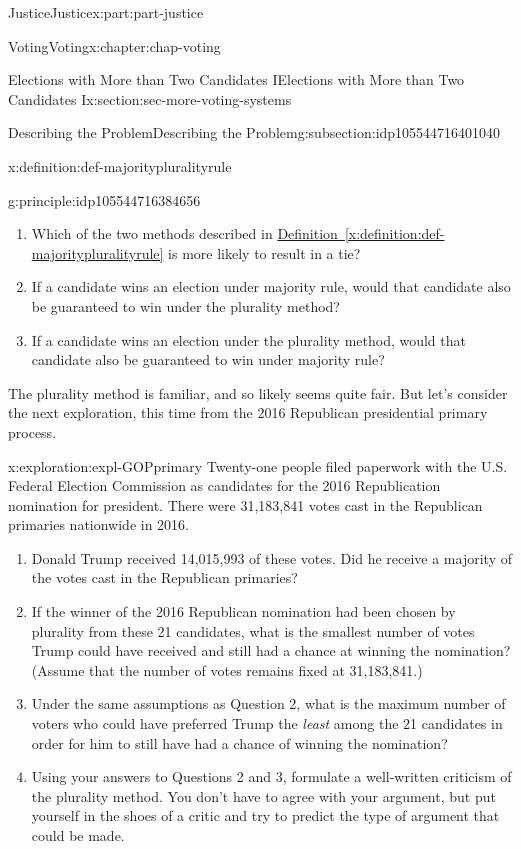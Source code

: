 \documentclass[oneside,10pt,]{book}
\newcommand{\xreffont}{\relax}
\numberwithin{equation}{section}
\begin{document}
\begin{partptx}{Justice}{}{Justice}{}{}{x:part:part-justice}
\begin{chapterptx}{Voting}{}{Voting}{}{}{x:chapter:chap-voting}
\begin{sectionptx}{Elections with More than Two Candidates I}{}{Elections with More than Two Candidates I}{}{}{x:section:sec-more-voting-systems}
\begin{subsectionptx}{Describing the Problem}{}{Describing the Problem}{}{}{g:subsection:idp105544716401040}
\begin{definition}{}{x:definition:def-majoritypluralityrule}
\end{definition}
\begin{principle}{}{}{g:principle:idp105544716384656}%
%
\begin{enumerate}
\item{}Which of the two methods described in \hyperref[x:definition:def-majoritypluralityrule]{Definition~{\xreffont\ref{x:definition:def-majoritypluralityrule}}} is more likely to result in a tie?%
\item{}If a candidate wins an election under majority rule, would that candidate also be guaranteed to win under the plurality method?%
\item{}If a candidate wins an election under the plurality method, would that candidate also be guaranteed to win under majority rule?%
\end{enumerate}
\end{principle}
The plurality method is familiar, and so likely seems quite fair. But let's consider the next exploration, this time from the 2016 Republican presidential primary process.%
\begin{exploration}{}{x:exploration:expl-GOPprimary}%
Twenty-one people filed paperwork with the U.S. Federal Election Commission as candidates for the 2016 Republication nomination for president. There were 31,183,841 votes cast in the Republican primaries nationwide in 2016.%
%
\begin{enumerate}
\item{}Donald Trump received 14,015,993 of these votes. Did he receive a majority of the votes cast in the Republican primaries?%
\item{}If the winner of the 2016 Republican nomination had been chosen by plurality from these 21 candidates, what is the smallest number of votes Trump could have received and still had a chance at winning the nomination? (Assume that the number of votes remains fixed at 31,183,841.)%
\item{}Under the same assumptions as Question 2, what is the maximum number of voters who could have preferred Trump the \emph{least} among the 21 candidates in order for him to still have had a chance of winning the nomination?%
\item{}Using your answers to Questions 2 and 3, formulate a well-written criticism of the plurality method. You don't have to agree with your argument, but put yourself in the shoes of a critic and try to predict the type of argument that could be made.%
\end{enumerate}
\end{exploration}%

\end{subsectionptx}
\end{sectionptx}
\end{chapterptx}
\end{partptx}
\end{document}
